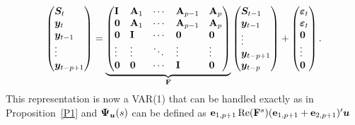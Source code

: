 \documentclass[AER,reviewmode]{tex/AEA}
\begin{document}
\begin{equation*}
  \begin{pmatrix*}[l]
    \Sv_t \\ \yv_t \\ \yv_{t-1} \\ \vdots \\ \yv_{t-p+1}
  \end{pmatrix*}
  =
  \underbrace{\begin{pmatrix*}[l]
    \Imat      & \Am_1    & \cdots & \Am_{p-1} & \Am_p    \\
    \Omat      & \Am_1    & \cdots & \Am_{p-1} & \Am_p    \\
    \Omat      & \Imat      & \cdots & \Omat       & \Omat      \\
    \vdots & \vdots & \ddots & \vdots  & \vdots \\
    \Omat      & \Omat      & \cdots & \Imat       & \Omat
  \end{pmatrix*}}_{\Fm}
  \begin{pmatrix*}[l]
    \Sv_{t-1}  \\ \yv_{t-1} \\ \vdots \\ \yv_{t-p+1} \\ \yv_{t-p}
  \end{pmatrix*}
  +
  \begin{pmatrix*}[l]
    \vepv_t \\ \vepv_t \\ \Ovec \\ \vdots \\ \Ovec
  \end{pmatrix*}.
\end{equation*}
This representation is now a VAR(1) that can be handled exactly as in
Proposition~\ref{P1} and $\bm{\Psi}_{\bm{u}}(s)$ can be defined as
$\mathbf{e}_{1,p+1} \operatorname{Re}(\mathbf{F}^s) (\mathbf{e}_{1,p+1} + \mathbf{e}_{2,p+1})' \bm{u}$
\end{document}
